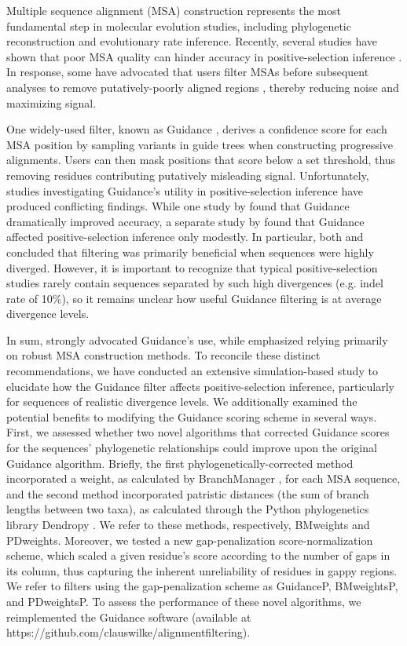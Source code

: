 \documentclass[11pt]{article}
\begin{document}
Multiple sequence alignment (MSA) construction represents the most fundamental step in molecular evolution studies, including phylogenetic reconstruction and evolutionary rate inference. Recently, several studies have shown that poor MSA quality can hinder accuracy in positive-selection inference \citep{Schneider2009, Fletcher2010, MarkovaRaina2011}. In response, some have advocated that users filter MSAs before subsequent analyses to remove putatively-poorly aligned regions \citep{Privman2012,Jordan2012}, thereby reducing noise and maximizing signal.

One widely-used filter, known as Guidance \citep{Penn2010}, derives a confidence score for each MSA position by sampling variants in guide trees when constructing progressive alignments. Users can then mask positions that score below a set threshold, thus removing residues contributing putatively misleading signal. Unfortunately, studies investigating Guidance's utility in positive-selection inference have produced conflicting findings. While one study by \citet{Privman2012} found that Guidance dramatically improved accuracy, a separate study by \citet{Jordan2012} found that Guidance affected positive-selection inference only modestly. In particular, both \citet{Privman2012} and \citet{Jordan2012} concluded that filtering was primarily beneficial when sequences were highly diverged. However, it is important to recognize that typical positive-selection studies rarely contain sequences separated by such high divergences (e.g. indel rate of 10\%), so it remains unclear how useful Guidance filtering is at average divergence levels.

In sum, \citet{Privman2012} strongly advocated Guidance's use, while \citet{Jordan2012} emphasized relying primarily on robust MSA construction methods. To reconcile these distinct recommendations, we have conducted an extensive simulation-based study to elucidate how the Guidance filter affects positive-selection inference, particularly for sequences of realistic divergence levels. We additionally examined the potential benefits to modifying the Guidance scoring scheme in several ways.  First, we assessed whether two novel algorithms that corrected Guidance scores for the sequences' phylogenetic relationships could improve upon the original Guidance algorithm. Briefly, the first phylogenetically-corrected method incorporated a weight, as calculated by BranchManager \citep{Stone2007}, for each MSA sequence, and the second method incorporated patristic distances (the sum of branch lengths between two taxa), as calculated through the Python phylogenetics library Dendropy \citep{Sukumaran2010}. We refer to these methods, respectively, BMweights and PDweights. Moreover, we tested a new gap-penalization score-normalization scheme, which scaled a given residue's score according to the number of gaps in its column, thus capturing the inherent unreliability of residues in gappy regions. We refer to filters using the gap-penalization scheme as GuidanceP, BMweightsP, and PDweightsP. To assess the performance of these novel algorithms, we reimplemented the Guidance software (available at https://github.com/clauswilke/alignment\underline{\hspace*{0.2cm}}filtering). 
\end{document}
